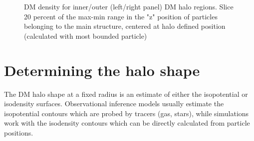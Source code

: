 \documentclass[a4paper,fleqn,usenatbib]{mnras}
\begin{document}
\begin{figure}
  \centering
  \hfill
  \hfill 
  \caption{DM density for inner/outer (left/right panel) DM halo regions.  
  Slice 20 percent of the max-min range in the "z" position of
  particles belonging to the main structure, centered at halo defined
  position (calculated with most bounded particle) }  
  \label{fig:slices}
\end{figure}

\section{Determining the halo shape}


The DM halo shape at a fixed radius is an estimate of either
the isopotential or isodensity surfaces.  
Observational inference models usually estimate the 
isopotential contours which are probed by tracers (gas, stars), while
simulations work with the isodensity contours which can be directly
calculated from particle positions.  
\end{document}
